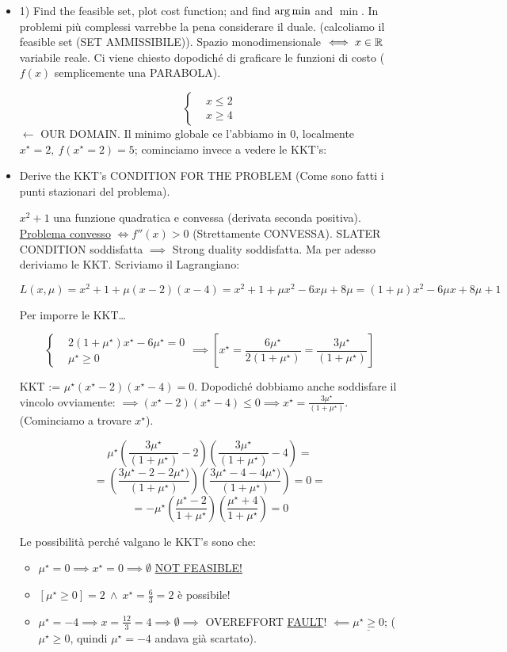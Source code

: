 \begin{itemize}
\item{1)} Find the feasible set, plot cost function; and find $\operatorname*{arg\,min}$ and $\min$. In problemi più complessi varrebbe la pena considerare il duale. (calcoliamo il feasible set (SET AMMISSIBILE)). Spazio monodimensionale $\iff x\in\mathbb{R}$ variabile reale.
Ci viene chiesto dopodiché di graficare le funzioni di costo ($f(x)$ semplicemente una PARABOLA). 

\[
	\left\{
	\begin{aligned}
	&x \leq 2\\
	&x \geq 4
	\end{aligned}
	\right.
\]
$\leftarrow$ OUR DOMAIN. Il minimo globale ce l'abbiamo in 0, localmente $x^\star=2,\ f(x^\star =2)=5$; cominciamo invece a vedere le KKT's:

\item Derive the KKT's CONDITION FOR THE PROBLEM (Come sono fatti i punti stazionari del problema).

$x^2+1$  una funzione quadratica e convessa (derivata seconda positiva). \underline{Problema convesso} $\iff f''(x)>0$ (Strettamente CONVESSA). SLATER CONDITION soddisfatta $\implies$ Strong duality soddisfatta. Ma per adesso deriviamo le KKT.
Scriviamo il Lagrangiano:

\[
	L(x,\mu) = x^2+1 + \mu(x-2)(x-4) = x^2+1+\mu x^2-6x\mu +8\mu = (1+\mu)x^2 - 6\mu x +8\mu +1
\]

Per imporre le KKT\dots 

\[
	\left\{
	\begin{aligned}
	&2(1+\mu^\star)x^\star -6\mu^\star = 0\\
	&\mu^\star\geq 0
	\end{aligned}
	\right. \implies [x^\star = \frac{6\mu^\star}{2(1+\mu^\star)} = \frac{3\mu^\star}{(1+\mu^\star)}]
\]

KKT := $\mu^\star(x^\star-2)(x^\star-4) = 0$.
Dopodiché dobbiamo anche soddisfare il vincolo ovviamente: $\implies (x^\star-2)(x^\star-4)\leq 0 \implies x^\star = \frac{3\mu^\star}{(1+\mu^\star)}$. (Cominciamo a trovare $x^\star$).

\[
	\mu^\star(\frac{3\mu^\star}{(1+\mu^\star)}-2)(\frac{3\mu^\star}{(1+\mu^\star)}-4) =
\]
\[
	= (\frac{3\mu^\star -2 -2\mu^\star)}{(1+\mu^\star)})(\frac{3\mu^\star-4-4\mu^\star)}{(1+\mu^\star)}) = 0 =
\]
\[
	= -\mu^\star(\frac{\mu^\star-2}{1+\mu^\star})(\frac{\mu^\star+4}{1+\mu^\star}) = 0
\]

Le possibilità perché valgano le KKT's sono che: 
\begin{itemize}
\item $\mu^\star=0 \implies x^\star = 0 \implies \emptyset$ \underline{NOT FEASIBLE!}
\item $[\mu^\star\geq 0] = 2\ \land\ x^\star = \frac{6}{3} = 2$ è possibile!
\item $\mu^\star=-4 \implies x=\frac{12}{3} = 4 \implies \emptyset \implies$ OVEREFFORT \underline{FAULT}! $\impliedby \underline{\mu^\star\geq 0}$;
($\mu^\star\geq 0$, quindi $\mu^\star=-4$ andava già scartato).
\end{itemize}


\end{itemize}
